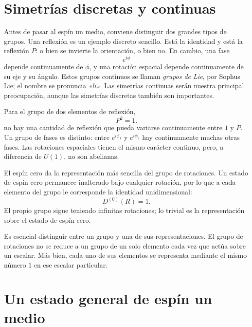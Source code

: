 \section{Simetrías discretas y continuas}

Antes de pasar al espín un medio, conviene distinguir dos grandes tipos de grupos. Una reflexión es un ejemplo discreto sencillo. Está la identidad y está la reflexión \(P\): o bien se invierte la orientación, o bien no. En cambio, una fase
\begin{equation}
e^{i\phi}
\end{equation}
depende continuamente de \(\phi\), y una rotación espacial depende continuamente de su eje y su ángulo. Estos grupos continuos se llaman \emph{grupos de Lie}, por Sophus Lie; el nombre se pronuncia \emph{«li»}. Las simetrías continuas serán nuestra principal preocupación, aunque las simetrías discretas también son importantes.

Para el grupo de dos elementos de reflexión,
\begin{equation}
P^2=1.
\end{equation}
no hay una cantidad de reflexión que pueda variarse continuamente entre \(1\) y \(P\). Un grupo de fases es distinto: entre \(e^{i\phi_1}\) y \(e^{i\phi_2}\) hay continuamente muchas otras fases. Las rotaciones espaciales tienen el mismo carácter continuo, pero, a diferencia de \(U(1)\), no son abelianas.

El espín cero da la representación más sencilla del grupo de rotaciones. Un estado de espín cero permanece inalterado bajo cualquier rotación, por lo que a cada elemento del grupo le corresponde la identidad unidimensional:
\begin{equation}
D^{(0)}(R)=1.
\end{equation}
El propio grupo sigue teniendo infinitas rotaciones; lo trivial es la representación sobre el estado de espín cero.

Es esencial distinguir entre un grupo y una de sus representaciones. El grupo de rotaciones no se reduce a un grupo de un solo elemento cada vez que actúa sobre un escalar. Más bien, cada uno de sus elementos se representa mediante el mismo número \(1\) en ese escalar particular.

\section{Un estado general de espín un medio}

